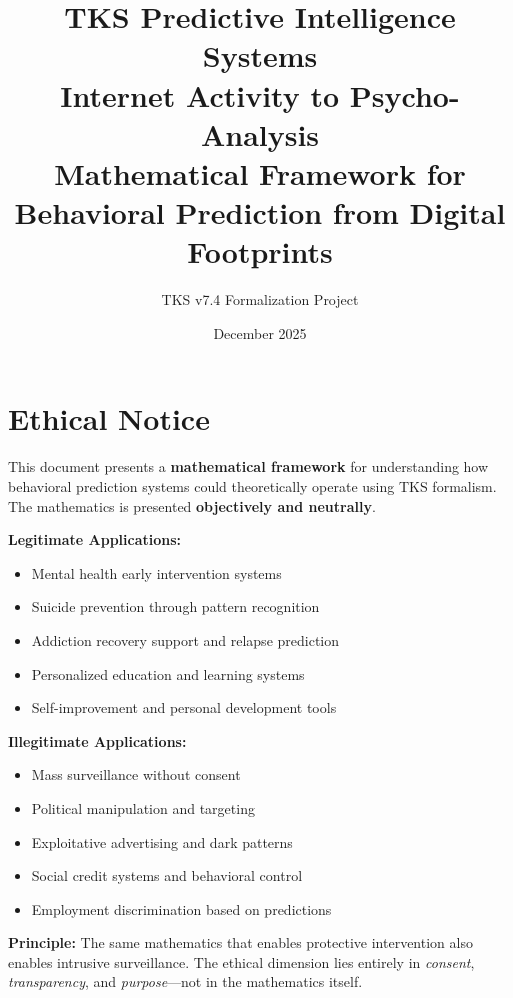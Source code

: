 \documentclass[11pt,twoside]{book}
\begin{document}
\title{\textbf{TKS Predictive Intelligence Systems} \\[0.5em]
\Large Internet Activity to Psycho-Analysis \\[0.3em]
\large Mathematical Framework for Behavioral Prediction from Digital Footprints}
\author{TKS v7.4 Formalization Project}
\date{December 2025}
\maketitle

\tableofcontents

\chapter*{Ethical Notice}

\begin{tcolorbox}[colback=red!5!white,colframe=red!75!black,title=\textbf{Critical Ethical Statement},breakable]
This document presents a \textbf{mathematical framework} for understanding how behavioral prediction systems could theoretically operate using TKS formalism. The mathematics is presented \textbf{objectively and neutrally}.

\textbf{Legitimate Applications:}
\begin{itemize}
    \item Mental health early intervention systems
    \item Suicide prevention through pattern recognition
    \item Addiction recovery support and relapse prediction
    \item Personalized education and learning systems
    \item Self-improvement and personal development tools
\end{itemize}

\textbf{Illegitimate Applications:}
\begin{itemize}
    \item Mass surveillance without consent
    \item Political manipulation and targeting
    \item Exploitative advertising and dark patterns
    \item Social credit systems and behavioral control
    \item Employment discrimination based on predictions
\end{itemize}

\textbf{Principle:} The same mathematics that enables protective intervention also enables intrusive surveillance. The ethical dimension lies entirely in \textit{consent}, \textit{transparency}, and \textit{purpose}---not in the mathematics itself.
\end{tcolorbox}
\end{document}
